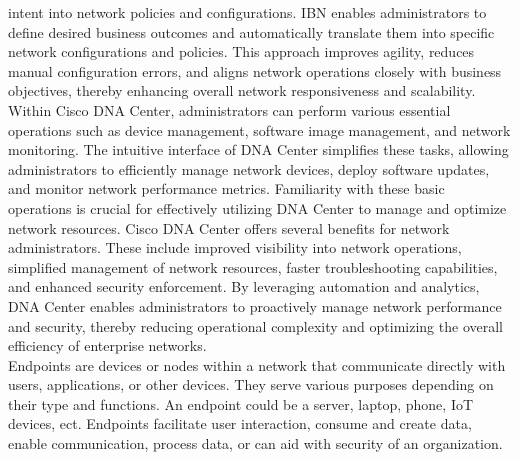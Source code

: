 \documentclass{article}
\begin{document}
intent into network policies and configurations. IBN enables administrators to define desired business outcomes and automatically translate them into specific network configurations and policies. This approach improves agility, reduces manual configuration errors, and aligns network operations closely with business objectives, thereby enhancing overall network responsiveness and scalability. Within Cisco DNA Center, administrators can perform various essential operations such as device management, software image management, and network monitoring. The intuitive interface of DNA Center simplifies these tasks, allowing administrators to efficiently manage network devices, deploy software updates, and monitor network performance metrics. Familiarity with these basic operations is crucial for effectively utilizing DNA Center to manage and optimize network resources. Cisco DNA Center offers several benefits for network administrators. These include improved visibility into network operations, simplified management of network resources, faster troubleshooting capabilities, and enhanced security enforcement. By leveraging automation and analytics, DNA Center enables administrators to proactively manage network performance and security, thereby reducing operational complexity and optimizing the overall efficiency of enterprise networks.\\

	Endpoints are devices or nodes within a network that communicate directly with users, applications, or other devices. They serve various purposes depending on their type and functions. An endpoint could be a server, laptop, phone, IoT devices, ect. Endpoints facilitate user interaction, consume and create data, enable communication, process data, or can aid with security of an organization.\\
\end{document}
